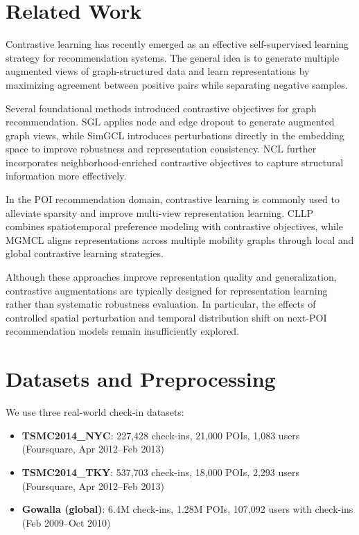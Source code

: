 \documentclass[12pt, journal]{IEEEtran}
\begin{document}
\section{Related Work}

Contrastive learning has recently emerged as an effective self-supervised learning strategy for recommendation systems. The general idea is to generate multiple augmented views of graph-structured data and learn representations by maximizing agreement between positive pairs while separating negative samples.

Several foundational methods introduced contrastive objectives for graph recommendation. SGL \cite{wu2021self} applies node and edge dropout to generate augmented graph views, while SimGCL \cite{yu2022simgcl} introduces perturbations directly in the embedding space to improve robustness and representation consistency. NCL \cite{lin2022ncl} further incorporates neighborhood-enriched contrastive objectives to capture structural information more effectively.

In the POI recommendation domain, contrastive learning is commonly used to alleviate sparsity and improve multi-view representation learning. CLLP \cite{zhou2024cllp} combines spatiotemporal preference modeling with contrastive objectives, while MGMCL \cite{jiang2025mgmcl} aligns representations across multiple mobility graphs through local and global contrastive learning strategies.

Although these approaches improve representation quality and generalization, contrastive augmentations are typically designed for representation learning rather than systematic robustness evaluation. In particular, the effects of controlled spatial perturbation and temporal distribution shift on next-POI recommendation models remain insufficiently explored.


\section{Datasets and Preprocessing}
We use three real-world check-in datasets:
\begin{itemize}
\item \textbf{TSMC2014\_NYC}: 227,428 check-ins, 21,000 POIs, 1,083 users (Foursquare, Apr 2012--Feb 2013) \cite{yang2015modeling}
\item \textbf{TSMC2014\_TKY}: 537,703 check-ins, 18,000 POIs, 2,293 users (Foursquare, Apr 2012--Feb 2013) \cite{yang2015modeling}
\item \textbf{Gowalla (global)}: 6.4M check-ins, 1.28M POIs, 107,092 users with check-ins (Feb 2009--Oct 2010) \cite{cho2011friendship}
\end{itemize}
\end{document}
